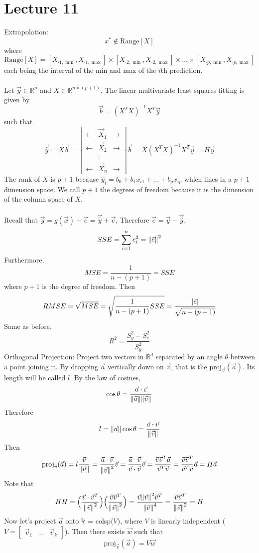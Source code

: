 \documentclass[12pt]{article}
\begin{document}
\section{Lecture 11} 
Extrapolation: $$ x^* \notin \text{Range}[X] $$ 
where $$\text{Range}[X] = [X_{\cdot 1, \min}, X_{\cdot 1, \max}] \times [X_{\cdot 2, \min}, X_{\cdot 2, \max}] \times \dots \times [X_{\cdot p, \min}, X_{\cdot p, \max}] $$ 
each being the interval of the min and max of the $i$th prediction. \\~\\
Let $\vec{y} \in \mathbb{R}^n$ and $X \in \mathbb{R}^{n \times (p+1)}$. The linear multivariate least squares fitting is given by $$\vec{b} = (X^TX)^{-1}X^T\vec{y}$$ 
such that $$\vec{\hat{y}} = X\vec{b} = \begin{bmatrix} \leftarrow & \vec{X}_1 & \rightarrow \\ \leftarrow & \vec{X}_2 & \rightarrow \\ & \vdots & \\ \leftarrow & \vec{X}_n & \rightarrow \end{bmatrix} \vec{b} = X(X^TX)^{-1}X^T\vec{y} = H\vec{y}$$ 
The rank of $X$ is $p+1$ because $\hat{y}_i = b_0 + b_1x_{i1} + \dots + b_px_{ip}$ which lines in a $p+1$ dimension space. We call $p+1$ the degrees of freedom because it is the dimension of the column space of $X$. \\~\\
Recall that $\vec{y} = g(\vec{x}) + \vec{e} = \vec{\hat{y}} + \vec{e}$, Therefore $\vec{e} = \vec{y} - \vec{\hat{y}}$. $$SSE = \sum_{i=1}^n e_i^2 = \norm{\vec{e}}^2 $$ 
Furthermore, $$MSE = \frac{1}{n - (p+1)} = SSE $$ where $p+1$ is the degree of freedom. Then $$RMSE = \sqrt{MSE} = \sqrt{\frac{1}{n - (p+1)} SSE} = \frac{\norm{\vec{e}}}{\sqrt{n-(p+1)}} $$ 
Same as before, $$R^2 = \frac{S_y^2 - S_e^2}{S_y^2} $$ 
Orthogonal Projection: Project two vectors in $\mathbb{R}^d$ separated by an angle $\theta$ between a point joining it. By dropping $\vec{a}$ vertically down on $\vec{v}$, that is the $\text{proj}_{\vec{v}} (\vec{a})$. Its length will be called $l$. By the law of cosines, $$\cos \theta = \frac{\vec{a} \cdot \vec{c}}{\norm{\vec{a}} \norm{\vec{v}}} $$ 
Therefore $$ l = \norm{\vec{a}} \cos\theta = \frac{\vec{a} \cdot \vec{v}}{\norm{\vec{v}}} $$ Then $$ \text{proj}_{\vec{v}} (\vec{a}) = l \frac{\vec{v}}{\norm{\vec{v}}} = \frac{\vec{a} \cdot \vec{v}}{\norm{\vec{v}}^2} \vec{v} = \frac{\vec{a} \cdot \vec{v}}{\vec{v} \cdot \vec{v}} \vec{v} = \frac{\vec{v}\vec{v}^T\vec{a}}{\vec{v}^T\vec{v}} = \frac{\vec{v}\vec{v}^T}{\vec{v}^T\vec{v}} \vec{a} = H\vec{a} $$ Note that 
$$ HH = \Big( \frac{\vec{v} \cdot \vec{v}^T}{\norm{\vec{v}}^2}\Big)\Big( \frac{\vec{v}\vec{v}^T}{\norm{\vec{v}}^2}\Big) = \frac{\vec{v} \norm{\vec{v}}^2\vec{v}^T}{\norm{\vec{v}}^4} = \frac{\vec{v}\vec{v}^T}{\norm{\vec{v}}^2} = H$$ 
Now let's project $\vec{a}$ onto $\mathbb{V}$ = colsp($V$), where $V$ is linearly independent ($V = \begin{bmatrix} \vec{v}_1 & \dots & \vec{v}_k \end{bmatrix}$). Then there exists $\vec{w}$ such that $$\text{proj}_{\vec{v}}(\vec{a}) = V\vec{w} $$ 
\end{document}
